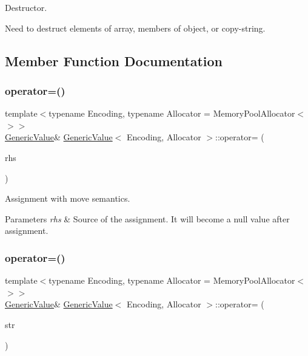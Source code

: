 Destructor. 

Need to destruct elements of array, members of object, or copy-\/string. 

\subsection{Member Function Documentation}
\mbox{\label{classGenericValue_a9018a40d7c52efc00daf803c51d3236c}} 
\subsubsection{\texorpdfstring{operator=()}{operator=()}\hspace{0.1cm}{\footnotesize\ttfamily [1/4]}}
{\footnotesize\ttfamily template$<$typename Encoding, typename Allocator = Memory\+Pool\+Allocator$<$$>$$>$ \\
\hyperlink{classGenericValue}{Generic\+Value}\& \hyperlink{classGenericValue}{Generic\+Value}$<$ Encoding, Allocator $>$\+::operator= (\begin{DoxyParamCaption}\item[{\hyperlink{classGenericValue}{Generic\+Value}$<$ Encoding, Allocator $>$ \&}]{rhs }\end{DoxyParamCaption})\hspace{0.3cm}{\ttfamily [inline]}}



Assignment with move semantics. 


\begin{DoxyParams}{Parameters}
{\em rhs} & Source of the assignment. It will become a null value after assignment. \\
\hline
\end{DoxyParams}
\mbox{\label{classGenericValue_a386708557555e6389184de608af5e6a6}} 
\subsubsection{\texorpdfstring{operator=()}{operator=()}\hspace{0.1cm}{\footnotesize\ttfamily [2/4]}}
{\footnotesize\ttfamily template$<$typename Encoding, typename Allocator = Memory\+Pool\+Allocator$<$$>$$>$ \\
\hyperlink{classGenericValue}{Generic\+Value}\& \hyperlink{classGenericValue}{Generic\+Value}$<$ Encoding, Allocator $>$\+::operator= (\begin{DoxyParamCaption}\item[{\hyperlink{classGenericValue_a32e0f30ee278072374c8168b14d3317f}{String\+Ref\+Type}}]{str }\end{DoxyParamCaption})\hspace{0.3cm}{\ttfamily [inline]}}



